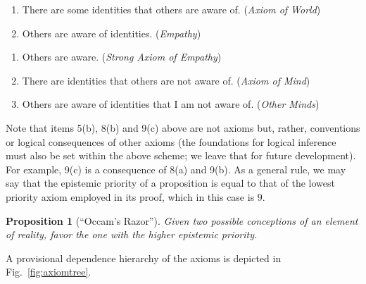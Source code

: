 \documentclass[pra,twocolumn,groupedaddress,10pt]{revtex4}
\newtheorem{proposition}[theorem]{Proposition}
\theoremstyle{definition}
\begin{document}
\begin{enumerate}[label={[\textbf{\arabic*}]},start=0]
	\item \begin{enumerate}
			\item There are some identities that others are aware of. (\emph{Axiom of World})
			\item Others are aware of identities. (\emph{Empathy})
		\end{enumerate}
	\item \begin{enumerate}
			\item Others are aware. (\emph{Strong Axiom of Empathy})
			\item There are identities that others are not aware of. (\emph{Axiom of Mind})
			\item Others are aware of identities that I am not aware of. (\emph{Other Minds})
		\end{enumerate}
\end{enumerate}

Note that items 5(b), 8(b) and 9(c) above are not axioms but, rather, conventions or logical consequences of other axioms (the foundations for logical inference must also be set within the above scheme; we leave that for future development). For example, 9(c) is a consequence of 8(a) and 9(b). As a general rule, we may say that the epistemic priority of a proposition is equal to that of the lowest priority axiom employed in its proof, which in this case is $9$.

\begin{proposition}[``Occam's Razor'']
	Given two possible conceptions of an element of reality, favor the one with the higher epistemic priority.
\end{proposition}

A provisional dependence hierarchy of the axioms is depicted in Fig.~\ref{fig:axiomtree}.
\end{document}
